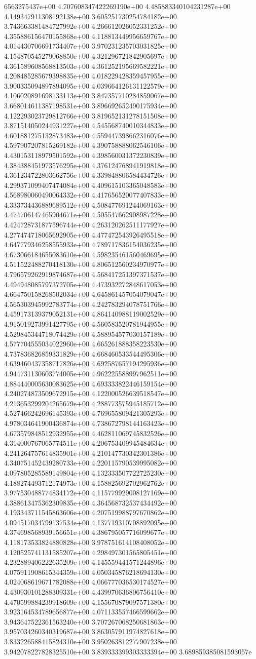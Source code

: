 6563275437e+00	4.707608347422269190e+00	4.485883340104231287e+00	4.149347911308192138e+00	3.605251730254784182e+00	3.743663381484727992e+00	4.266612026052331252e+00	4.355886156470155868e+00	4.118813449956659767e+00	4.014430706691734407e+00	3.970231235703031825e+00	4.154870545279068850e+00	4.321296721842905697e+00	4.361589608568813503e+00	4.361252195669582221e+00	4.208485285679398835e+00	4.018229428359457955e+00	3.900335094897894095e+00	4.039664126131122579e+00	4.106020891698133113e+00	3.847357710284859067e+00	3.668014611387198531e+00	3.896692652490175934e+00	4.122293023729812766e+00	3.819652131278151508e+00	3.871514050244931227e+00	4.545568740010344833e+00	4.601881275132873483e+00	4.559447398662316076e+00	4.597907207815269182e+00	4.390758888062546106e+00	4.430153118979501592e+00	4.398560031372230839e+00	4.384388451973576295e+00	4.376124768941919818e+00	4.361234722803662756e+00	4.339848806584434726e+00	4.299371099407474084e+00	4.409615103365048583e+00	4.568980060490064332e+00	4.417656520077407833e+00	4.333734436889689512e+00	4.508477691244069163e+00	4.474706147465904671e+00	4.505547662908987228e+00	4.424728731877596744e+00	4.263120262511177927e+00	4.277474718065692905e+00	4.477472543926495518e+00	4.647779346258555933e+00	4.789717836154036235e+00	4.673066184655083610e+00	4.598235461560469695e+00	4.511522488270418130e+00	4.806512560234970977e+00	4.796579262919874687e+00	4.568417251397371537e+00	4.494948085797372705e+00	4.473932272848617053e+00	4.664750158268502034e+00	4.645861457054079047e+00	4.565303945992783774e+00	4.242783294078751766e+00	4.459173139379052131e+00	4.864140988119002529e+00	4.915019273991427795e+00	4.560583520781944955e+00	4.529845344718074429e+00	4.588954577030157189e+00	4.577704555034022960e+00	4.665261888358223530e+00	4.737836826859331829e+00	4.668460533544495306e+00	4.639460437358717826e+00	4.692587657194295936e+00	4.944731130603774005e+00	4.962225588997962511e+00	4.884440005630083625e+00	4.693333822446159154e+00	4.240274873509672915e+00	4.122000526639518547e+00	4.213653299204265679e+00	4.288773575945185712e+00	4.527466242696145393e+00	4.769655809421305293e+00	4.978034641900436874e+00	4.738672798144163423e+00	4.673579848512932955e+00	4.462811069745832526e+00	4.314000767065774511e+00	4.206753409945484634e+00	4.241264757614835901e+00	4.210147730342301386e+00	4.340751452439280733e+00	4.220115790539995082e+00	4.097805285589149804e+00	4.132333507722725230e+00	4.188274493712174973e+00	4.158825692702962762e+00	3.977530488774834172e+00	4.115779929008127169e+00	4.388613475362309835e+00	4.364568732537434492e+00	4.193343711545863606e+00	4.207519988797670862e+00	4.094517034799137534e+00	4.137719310708892095e+00	4.374698568939156651e+00	4.386795057716099677e+00	4.118173533824880828e+00	3.978751614108408052e+00	4.120525741131585207e+00	4.298497301565805451e+00	4.232889406222635209e+00	4.145559441571244896e+00	4.075911908615344359e+00	4.050345876218694130e+00	4.024068619671782088e+00	4.066777036530174527e+00	4.430930101288309331e+00	4.439970636806756410e+00	4.470599884239918609e+00	4.155670879097571380e+00	3.923164534789656877e+00	4.071133557466599662e+00	3.943647522361563240e+00	3.707267068250681863e+00	3.957034260340319687e+00	3.863057911974827618e+00	3.833226588415824310e+00	3.950263812277907238e+00	3.942078227828325510e+00	3.839333399303333394e+00	3.689859385081593057e